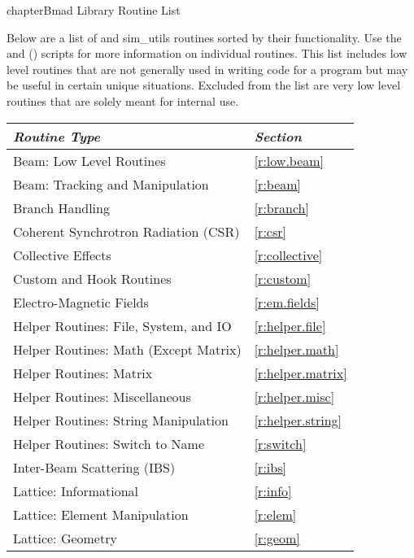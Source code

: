 chapter{Bmad Library Routine List}

Below are a list of \bmad and sim_utils routines sorted by their
functionality.  Use the  and  ()
scripts for more information on individual routines.
This list includes low level routines that are not generally used in
writing code for a program but may be useful in certain unique
situations.  Excluded from the list are very low level routines that are
solely meant for \bmad internal use.

\toffset
\begin{center}
\begin{tabular}{ll} \toprule
{\em Routine Type} & {\em Section} \\ \midrule
  Beam: Low Level Routines                    & \ref{r:low.beam}       \\
  Beam: Tracking and Manipulation             & \ref{r:beam}           \\
  Branch Handling                             & \ref{r:branch}         \\
  Coherent Synchrotron Radiation (CSR)        & \ref{r:csr}            \\
  Collective Effects                          & \ref{r:collective}     \\
  Custom and Hook Routines                    & \ref{r:custom}         \\
  Electro-Magnetic Fields                     & \ref{r:em.fields}      \\
  Helper Routines: File, System, and IO       & \ref{r:helper.file}    \\
  Helper Routines: Math (Except Matrix)       & \ref{r:helper.math}    \\
  Helper Routines: Matrix                     & \ref{r:helper.matrix}  \\
  Helper Routines: Miscellaneous              & \ref{r:helper.misc}    \\
  Helper Routines: String Manipulation        & \ref{r:helper.string}  \\
  Helper Routines: Switch to Name             & \ref{r:switch}         \\
  Inter-Beam Scattering (IBS)                 & \ref{r:ibs}            \\
  Lattice: Informational                      & \ref{r:info}           \\
  Lattice: Element Manipulation               & \ref{r:elem}           \\
  Lattice: Geometry                           & \ref{r:geom}           \\

\end{tabular}
\end{center}
